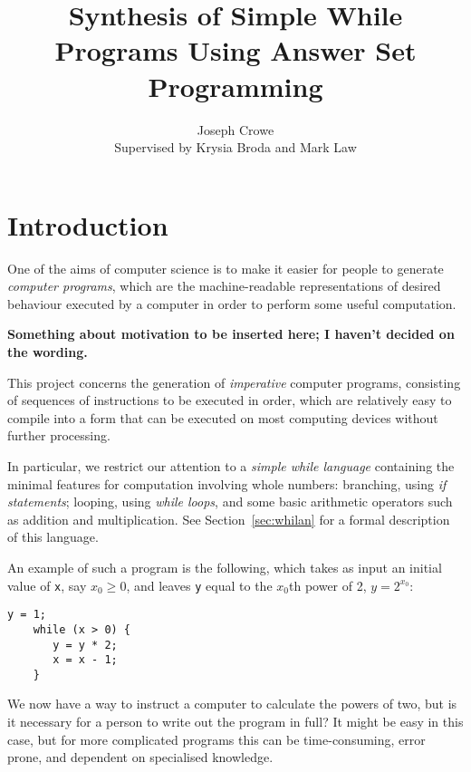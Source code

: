 \documentclass[a4paper,twoside,notitlepage]{article}
\begin{document}
\title{Synthesis of Simple While Programs Using Answer Set Programming}
\author{Joseph Crowe \\ Supervised by Krysia Broda and Mark Law}
\maketitle
\clearpage

\tableofcontents
\clearpage

\section{Introduction} \label{sec:intro}

One of the aims of computer science is to make it easier for people to 
generate \emph{computer programs}, which are the machine-readable 
representations of desired behaviour executed by a computer in order to 
perform some useful computation.

\textbf{Something about motivation to be inserted here; I haven't decided on 
the wording.}

This project concerns the generation of \emph{imperative} computer 
programs, consisting of sequences of instructions to be executed in order, 
which are relatively easy to compile into a form that can be executed on 
most computing devices without further processing.

In particular, we restrict our attention to a \emph{simple while language} 
containing the minimal features for computation involving whole numbers: 
branching, using \emph{if statements}; looping, using \emph{while loops}, 
and some basic arithmetic operators such as addition and multiplication.
See Section~\ref{sec:whilan} for a formal description of this language.

An example of such a program is the following, which takes as input an initial 
value of \texttt{x}, say $x_0 \ge 0$, and leaves \texttt{y} equal to the 
$x_0$th power of 2, $y = 2^{x_0}$:
\begin{Verbatim}[samepage=true]
    y = 1;
    while (x > 0) {
       y = y * 2;
       x = x - 1;
    }
\end{Verbatim}

We now have a way to instruct a computer to calculate the powers of two, 
but is it necessary for a person to write out the program in full? It 
might be easy in this case, but for more complicated programs this can be 
time-consuming, error prone, and dependent on specialised knowledge.
\end{document}
